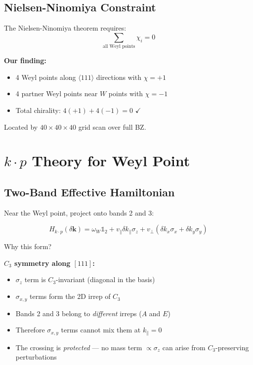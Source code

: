 \documentclass[11pt,letterpaper]{article}
\begin{document}
\subsection{Nielsen-Ninomiya Constraint}

\begin{keyresult}[title={Partner Weyl Points}]
The Nielsen-Ninomiya theorem requires:
\begin{equation}
\sum_{\text{all Weyl points}} \chi_i = 0
\end{equation}

\textbf{Our finding:}
\begin{itemize}
    \item 4 Weyl points along $\langle 111 \rangle$ directions with $\chi = +1$
    \item 4 partner Weyl points near $W$ points with $\chi = -1$
    \item Total chirality: $4(+1) + 4(-1) = 0$ $\checkmark$
\end{itemize}

Located by $40 \times 40 \times 40$ grid scan over full BZ.
\end{keyresult}

\section{$k \cdot p$ Theory for Weyl Point}

\subsection{Two-Band Effective Hamiltonian}

Near the Weyl point, project onto bands 2 and 3:

\begin{equation}
\boxed{
H_{k\cdot p}(\delta\bm{k}) = \omega_W \mathbb{1}_2 + v_\parallel \delta k_\parallel \sigma_z + v_\perp (\delta k_x \sigma_x + \delta k_y \sigma_y)
}
\end{equation}

\begin{derivation}[title={Symmetry Constraints}]
Why this form?

\textbf{$C_3$ symmetry along $[111]$:}
\begin{itemize}
    \item $\sigma_z$ term is $C_3$-invariant (diagonal in the basis)
    \item $\sigma_{x,y}$ terms form the 2D irrep of $C_3$
    \item Bands 2 and 3 belong to \emph{different} irreps ($A$ and $E$)
    \item Therefore $\sigma_{x,y}$ terms cannot mix them at $k_\parallel = 0$
    \item The crossing is \emph{protected} --- no mass term $\propto \sigma_z$ can arise from $C_3$-preserving perturbations
\end{itemize}
\end{derivation}
\end{document}
